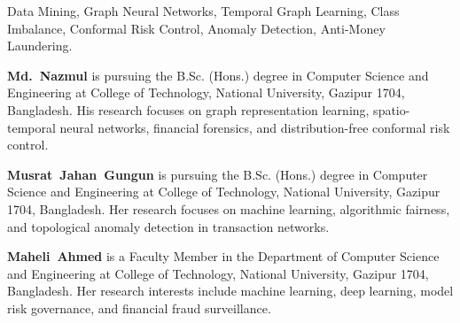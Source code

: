 \documentclass[lettersize,journal]{IEEEtran}
\begin{document}
\begin{IEEEkeywords}
Data Mining, Graph Neural Networks, Temporal Graph Learning, Class Imbalance, Conformal Risk Control, Anomaly Detection, Anti-Money Laundering.
\end{IEEEkeywords}

\IEEEpeerreviewmaketitle













\vspace{1.0ex}
{\footnotesize
\noindent\textbf{Md.~Nazmul} is pursuing the B.Sc. (Hons.) degree in Computer Science and Engineering at College of Technology, National University, Gazipur 1704, Bangladesh. His research focuses on graph representation learning, spatio-temporal neural networks, financial forensics, and distribution-free conformal risk control.\par\vspace{1.0ex}
\noindent\textbf{Musrat~Jahan~Gungun} is pursuing the B.Sc. (Hons.) degree in Computer Science and Engineering at College of Technology, National University, Gazipur 1704, Bangladesh. Her research focuses on machine learning, algorithmic fairness, and topological anomaly detection in transaction networks.\par\vspace{1.0ex}
\noindent\textbf{Maheli~Ahmed} is a Faculty Member in the Department of Computer Science and Engineering at College of Technology, National University, Gazipur 1704, Bangladesh. Her research interests include machine learning, deep learning, model risk governance, and financial fraud surveillance.\par
}
\end{document}
